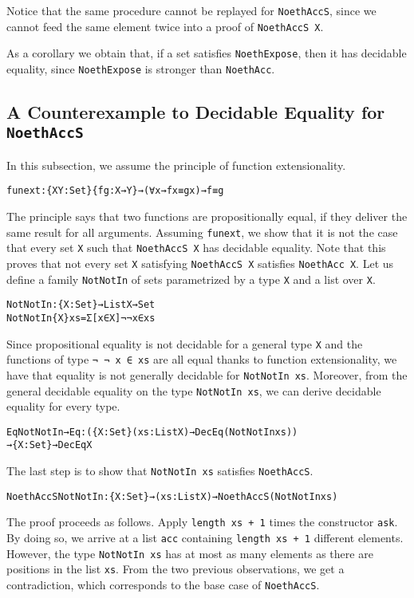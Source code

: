 \documentclass{eptcs}
\begin{document}
Notice that the same procedure cannot be replayed for
\verb+NoethAccS+, since we cannot feed the same element twice into a
proof of \verb+NoethAccS X+. 

As a corollary we obtain that, if a set satisfies \verb;NoethExpose;,
then it has decidable equality, since \verb;NoethExpose; is stronger
than \verb;NoethAcc;.

\subsection{A Counterexample to Decidable Equality for \texttt{NoethAccS}}
\label{decidable-equality-for-noethaccs-a-counterexample}

In this subsection, we assume the principle of function extensionality.
\begin{alltt}
funext : \{X Y : Set\} \{f g : X → Y\} → (∀ x → f x ≡ g x) → f ≡ g
\end{alltt}
The principle says that two functions are propositionally equal, if they deliver the same result for all arguments.  Assuming \verb;funext;, we show that it
is not the case that every set \verb;X; such that \verb;NoethAccS X; has
decidable equality. Note that this proves that not every set \verb;X; satisfying
\verb;NoethAccS X; satisfies \verb;NoethAcc X;.  Let us define a family
\verb;NotNotIn; of sets parametrized by a type \verb;X; and a list over
\verb;X;.
\begin{alltt}
NotNotIn : \{X : Set\} → List X → Set
NotNotIn \{X\} xs = Σ[ x ∈ X ] ¬ ¬ x ∈ xs
\end{alltt}
Since propositional equality is not decidable for a general type \verb;X; and
the functions of type \verb;¬ ¬ x ∈ xs; are all equal thanks to function
extensionality, we have that equality is not generally decidable for
\verb;NotNotIn xs;. Moreover, from the general decidable equality
on the type \verb;NotNotIn xs;, we can derive decidable equality for every type.
\begin{alltt}
EqNotNotIn→Eq : (\{X : Set\} (xs : List X) → DecEq (NotNotIn xs))
  → \{X : Set\} → DecEq X
\end{alltt}
The last step is to show that \verb;NotNotIn xs; satisfies
\verb;NoethAccS;.
\begin{alltt}
NoethAccSNotNotIn : \{X : Set\} → (xs : List X) → NoethAccS (NotNotIn xs)
\end{alltt}
The proof proceeds as follows. Apply \verb;length xs + 1; times the
constructor \verb;ask;. By doing so, we arrive at a list \verb;acc;
containing \verb;length xs + 1; different elements. However, the type
\verb;NotNotIn xs; has at most as many elements as there are positions
in the list \verb;xs;. From the two previous observations, we get a
contradiction, which corresponds to the base case of \verb;NoethAccS;. 
\end{document}
